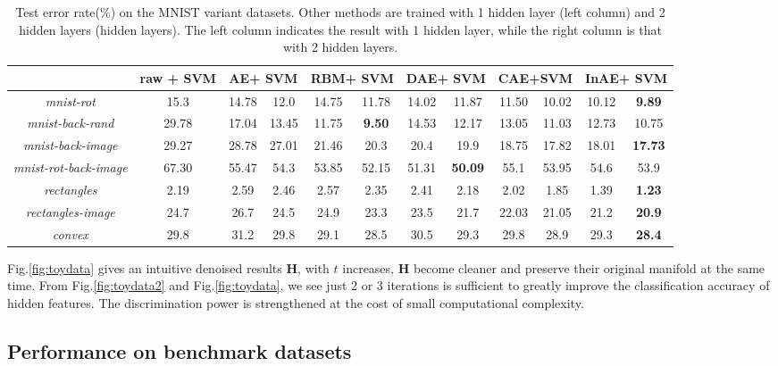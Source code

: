 \documentclass{article}
\def \HH{\mathbf H}
\begin{document}
\begin{table*}[!htbp]
\caption{Test error rate(\%) on the MNIST variant datasets.  Other methods are trained with 1 hidden layer (left column) and 2 hidden layers (hidden layers). The left column indicates the result with 1 hidden layer, while the right column is that with 2 hidden layers.}
\centering
  \begin{tabular}{|c|c|c|c|c|c|c|c|c|c|c|c|}
  \hline
   &raw + SVM& \multicolumn{2}{|c|}{AE+ SVM} & \multicolumn{2}{|c|}{RBM+ SVM} & \multicolumn{2}{|c|}{DAE+ SVM} &\multicolumn{2}{|c|}{CAE+SVM}& \multicolumn{2}{|c|}{InAE+ SVM}\\
   \hline
   \hline
   \emph{mnist-rot} & 15.3 & 14.78 & 12.0 & 14.75 & 11.78& 14.02& 11.87& 11.50 & 10.02& 10.12& \textbf{9.89} \\
   \hline
    \emph{ mnist-back-rand} & 29.78 & 17.04& 13.45& 11.75& \textbf{9.50}& 14.53& 12.17&13.05& 11.03& 12.73& 10.75\\
    \hline
    \emph{mnist-back-image}& 29.27& 28.78& 27.01& 21.46& 20.3& 20.4& 19.9& 18.75& 17.82&18.01& \textbf{17.73} \\
    \hline
     \emph{mnist-rot-back-image} & 67.30& 55.47& 54.3& 53.85& 52.15& 51.31& \textbf{50.09}& 55.1& 53.95& 54.6& 53.9 \\
     \hline
     \emph{rectangles}& 2.19& 2.59& 2.46& 2.57& 2.35& 2.41& 2.18&2.02& 1.85&  1.39& \textbf{1.23} \\
     \hline
     \emph{rectangles-image} & 24.7& 26.7& 24.5& 24.9& 23.3& 23.5& 21.7&22.03& 21.05&  21.2& \textbf{20.9} \\
     \hline
     \emph{convex} & 29.8& 31.2& 29.8& 29.1& 28.5& 30.5& 29.3& 29.8& 28.9& 29.3& \textbf{28.4}\\
     \hline
  \end{tabular}
  \label{tab:bb}
\end{table*}


Fig.\ref{fig:toydata} gives an intuitive denoised results $\HH$,
with $t$ increases,
$\HH$ become cleaner and preserve their original manifold at the same time.
From Fig.\ref{fig:toydata2} and Fig.\ref{fig:toydata}, we see just 2 or 3 iterations is sufficient to greatly improve the classification accuracy of hidden features.
The discrimination power is strengthened at the cost of small computational complexity.

\subsection{Performance on benchmark datasets}
\end{document}
